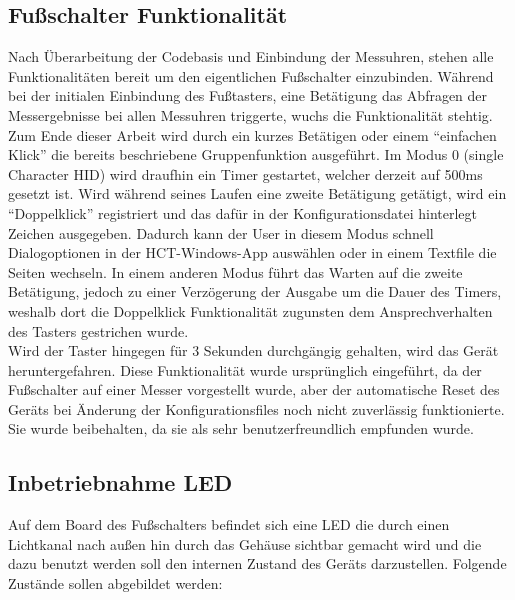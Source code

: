 \subsection{Fußschalter Funktionalität}
Nach Überarbeitung der Codebasis und Einbindung der Messuhren, stehen alle Funktionalitäten bereit um den eigentlichen Fußschalter einzubinden. Während bei der initialen Einbindung des Fußtasters, eine Betätigung das Abfragen der Messergebnisse bei allen Messuhren triggerte, wuchs die Funktionalität stehtig.\\
Zum Ende dieser Arbeit wird durch ein kurzes Betätigen oder einem ``einfachen Klick'' die bereits beschriebene Gruppenfunktion ausgeführt. Im Modus 0 (single Character HID) wird draufhin ein Timer gestartet, welcher derzeit auf 500ms gesetzt ist. Wird während seines Laufen eine zweite Betätigung getätigt, wird ein ``Doppelklick'' registriert und das dafür in der Konfigurationsdatei hinterlegt Zeichen ausgegeben. Dadurch kann der User in diesem Modus schnell Dialogoptionen in der HCT-Windows-App auswählen oder in einem Textfile die Seiten wechseln. In einem anderen Modus führt das Warten auf die zweite Betätigung, jedoch zu einer Verzögerung der Ausgabe um die Dauer des Timers, weshalb dort die Doppelklick Funktionalität zugunsten dem Ansprechverhalten des Tasters gestrichen wurde.\\
Wird der Taster hingegen für 3 Sekunden durchgängig gehalten, wird das Gerät heruntergefahren. Diese Funktionalität wurde ursprünglich eingeführt, da der Fußschalter auf einer Messer vorgestellt wurde, aber der automatische Reset des Geräts bei Änderung der Konfigurationsfiles noch nicht zuverlässig funktionierte. Sie wurde beibehalten, da sie als sehr benutzerfreundlich empfunden wurde.

\subsection{Inbetriebnahme LED}
Auf dem Board des Fußschalters befindet sich eine LED die durch einen Lichtkanal nach außen hin durch das Gehäuse sichtbar gemacht wird und die dazu benutzt werden soll den internen Zustand des Geräts darzustellen. Folgende Zustände sollen abgebildet werden: 

